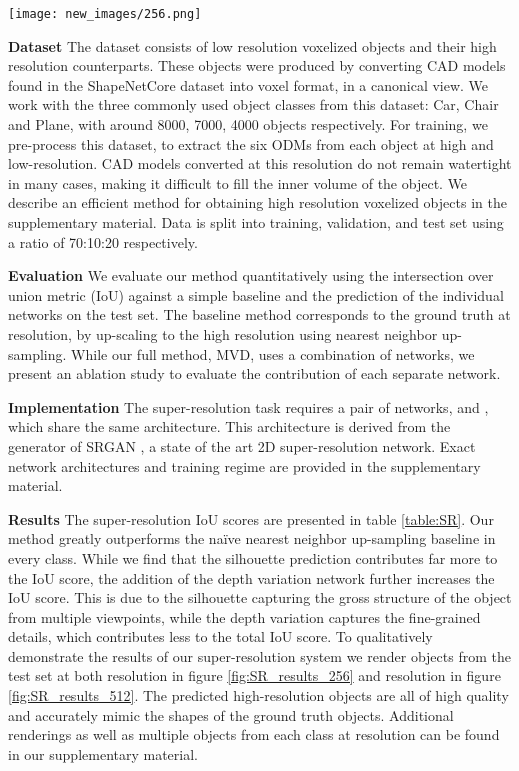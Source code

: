 \documentclass{article}
\begin{document}
\begin{figure*} 
\texttt{[image: new\_images/256.png]}
\centering
\caption{Super-resolution rendering results. Each pair shows the low resolution input (left) and the results of MVD at  resolution (right).} \label{fig:SR_results_256}
\end{figure*}


\textbf{Dataset} \quad The dataset consists of  low resolution voxelized objects and their  high resolution counterparts. These objects were produced by converting CAD models found in the ShapeNetCore dataset \cite{ShapeNet} into voxel format, in a canonical view. We work with the three commonly used object classes from this dataset: Car, Chair and Plane, with around 8000, 7000, 4000 objects respectively. For training, we pre-process this dataset, to extract the six ODMs from each object at high and low-resolution. CAD models converted at this resolution do not remain watertight in many cases, making it difficult to fill the inner volume of the object. We describe an efficient method for obtaining high resolution voxelized objects in the supplementary material. Data is split into training, validation, and test set using a ratio of 70:10:20 respectively.


\textbf{Evaluation} \quad We evaluate our method quantitatively using the intersection over union metric (IoU) against a simple baseline and the prediction of the individual networks on the test set. The baseline method corresponds to the ground truth at  resolution, by up-scaling to the high resolution using nearest neighbor up-sampling. While our full method, MVD, uses a combination of networks, we present an ablation study to evaluate the contribution of each separate network. 


\textbf{Implementation} \quad The super-resolution task requires a pair of networks,  and , which share the same architecture. This architecture is derived from the generator of SRGAN \cite{SRGAN}, a state of the art 2D super-resolution network. Exact network architectures and training regime are provided in the supplementary material. 

\textbf{Results} \quad The super-resolution IoU scores are presented in table \ref{table:SR}. Our method greatly outperforms the na{\"i}ve nearest neighbor up-sampling baseline in every class. While we find that the silhouette prediction contributes far more to the IoU score, the addition of the depth variation network further increases the IoU score. This is due to the silhouette capturing the gross structure of the object from multiple viewpoints, while the depth variation captures the fine-grained details, which contributes less to the total IoU score. To qualitatively demonstrate the results of our super-resolution system we render objects from the test set at both  resolution in figure \ref{fig:SR_results_256} and  resolution in figure \ref{fig:SR_results_512}. The predicted high-resolution objects are all of high quality and accurately mimic the shapes of the ground truth objects. Additional  renderings as well as multiple objects from each class at  resolution can be found in our supplementary material.
\end{document}

